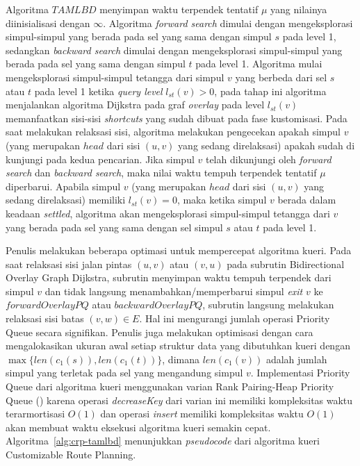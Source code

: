 Algoritma $TAMLBD$ menyimpan waktu terpendek tentatif $\mu$ yang nilainya diinisialisasi dengan $\infty$. Algoritma \textit{forward search} dimulai dengan mengeksplorasi simpul-simpul yang berada pada sel yang sama dengan simpul $s$ pada level 1, sedangkan \textit{backward search} dimulai dengan mengeksplorasi simpul-simpul yang berada pada sel yang sama dengan simpul $t$ pada level 1. Algoritma mulai mengeksplorasi simpul-simpul tetangga dari simpul $v$ yang berbeda dari sel $s$ atau $t$ pada level 1 ketika \textit{query level} $l_{st}(v)>0$, pada tahap ini algoritma menjalankan algoritma Dijkstra pada graf \textit{overlay} pada level $l_{st}(v)$ memanfaatkan sisi-sisi \textit{shortcuts} yang sudah dibuat pada fase kustomisasi. Pada saat melakukan relaksasi sisi, algoritma melakukan pengecekan apakah simpul $v$ (yang merupakan $head$ dari sisi $(u,v)$ yang sedang direlaksasi) apakah sudah di kunjungi pada kedua pencarian. Jika simpul $v$ telah dikunjungi oleh \textit{forward search} dan \textit{backward search}, maka nilai waktu tempuh terpendek tentatif $\mu$ diperbarui. Apabila simpul $v$ (yang merupakan $head$ dari sisi $(u,v)$ yang sedang direlaksasi) memiliki $l_{st}(v) = 0$, maka ketika simpul $v$ berada dalam keadaan \textit{settled}, algoritma akan mengeksplorasi simpul-simpul tetangga dari $v$ yang berada pada sel yang sama dengan sel simpul $s$ atau $t$ pada level 1.

Penulis melakukan beberapa optimasi untuk mempercepat algoritma kueri. Pada saat relaksasi sisi jalan pintas $(u,v)$ atau $(v,u)$ pada subrutin Bidirectional Overlay Graph Dijkstra, subrutin menyimpan waktu tempuh terpendek dari simpul $v$ dan tidak langsung menambahkan/memperbarui simpul \textit{exit} $v$ ke $forwardOverlayPQ$ atau $backwardOverlayPQ$, subrutin langsung melakukan relaksasi sisi batas $(v,w)\in E$. Hal ini mengurangi jumlah operasi Priority Queue secara signifikan. Penulis juga melakukan optimisasi dengan cara mengalokasikan ukuran awal setiap struktur data yang dibutuhkan kueri dengan $\max\{len(c_1(s)),len(c_1(t))\}$, dimana $len(c_1(v))$ adalah jumlah simpul yang terletak pada sel yang mengandung simpul $v$. Implementasi Priority Queue dari algoritma kueri menggunakan varian Rank Pairing-Heap Priority Queue (\cite{Haeupler2009}) karena operasi \textit{decreaseKey} dari varian ini memiliki kompleksitas waktu terarmortisasi $O(1)$ dan operasi \textit{insert} memiliki kompleksitas waktu $O(1)$ akan membuat waktu eksekusi algoritma kueri semakin cepat. Algoritma~\ref{alg:crp-tamlbd} menunjukkan \textit{pseudocode} dari algoritma kueri Customizable Route Planning.


